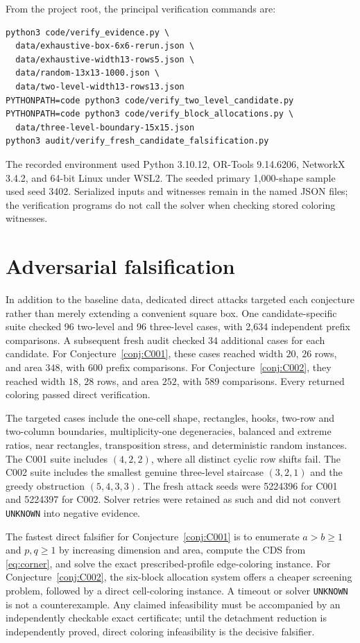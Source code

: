 \documentclass[11pt]{amsart}
\theoremstyle{definition}
\begin{document}
From the project root, the principal verification commands are:
\begin{verbatim}
python3 code/verify_evidence.py \
  data/exhaustive-box-6x6-rerun.json \
  data/exhaustive-width13-rows5.json \
  data/random-13x13-1000.json \
  data/two-level-width13-rows13.json
PYTHONPATH=code python3 code/verify_two_level_candidate.py
PYTHONPATH=code python3 code/verify_block_allocations.py \
  data/three-level-boundary-15x15.json
python3 audit/verify_fresh_candidate_falsification.py
\end{verbatim}
The recorded environment used Python 3.10.12, OR-Tools 9.14.6206,
NetworkX 3.4.2, and 64-bit Linux under WSL2.  The seeded primary
1,000-shape sample used seed 3402.  Serialized inputs and witnesses remain
in the named JSON files; the verification programs do not call the solver
when checking stored coloring witnesses.

\section{Adversarial falsification}

In addition to the baseline data, dedicated direct attacks targeted each
conjecture rather than merely extending a convenient square box.  One
candidate-specific suite checked 96 two-level and 96 three-level cases, with
2,634 independent prefix comparisons.  A subsequent fresh audit checked
34 additional cases for each candidate.  For
Conjecture~\ref{conj:C001}, these cases reached width $20$, $26$ rows, and
area $348$, with 600 prefix comparisons.  For
Conjecture~\ref{conj:C002}, they reached width $18$, $28$ rows, and area
$252$, with 589 comparisons.  Every returned coloring passed direct
verification.

The targeted cases include the one-cell shape, rectangles, hooks, two-row
and two-column boundaries, multiplicity-one degeneracies, balanced and
extreme ratios, near rectangles, transposition stress, and deterministic
random instances.  The C001 suite includes $(4,2,2)$, where all distinct
cyclic row shifts fail.  The C002 suite includes the smallest genuine
three-level staircase $(3,2,1)$ and the greedy obstruction
$(5,4,3,3)$.  The fresh attack seeds were 5224396 for C001 and 5224397
for C002.  Solver retries were retained as such and did not convert
\texttt{UNKNOWN} into negative evidence.

The fastest direct falsifier for Conjecture~\ref{conj:C001} is to enumerate
$a>b\geq1$ and $p,q\geq1$ by increasing dimension and area, compute the
CDS from \eqref{eq:corner}, and solve the exact prescribed-profile
edge-coloring instance.  For Conjecture~\ref{conj:C002}, the six-block
allocation system offers a cheaper screening problem, followed by a direct
cell-coloring instance.  A timeout or solver \texttt{UNKNOWN} is not a
counterexample.  Any claimed infeasibility must be accompanied by an
independently checkable exact certificate; until the detachment reduction is
independently proved, direct coloring infeasibility is the decisive
falsifier.
\end{document}

